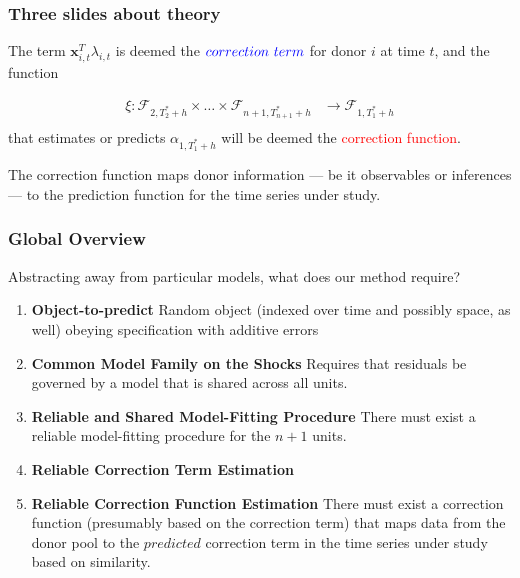 \documentclass[9pt]{beamer}
\newcommand{\x}{\textbf{x}}
\theoremstyle{definition}
\begin{document}
\begin{frame}\frametitle{Three slides about theory}
    The term $\x^{T}_{i,t}\lambda_{i,t}$ is deemed the $\textcolor{blue}{correction} \text{ } \textcolor{blue}{term}$ for donor $i$ at time $t$, and the function

    \begin{align*}
      \xi \colon \mathcal{F}_{2,T^{*}_{2}+h} \times \ldots \times \mathcal{F}_{n+1, T^{*}_{n+1}+h} &\to \mathcal{F}_{1,T^{*}_{1}+h}\\
    \end{align*}
    that estimates or predicts $\alpha_{1,T^{*}_{1}+h}$ will be deemed the \textcolor{red}{correction function}.  
    
    \bigskip 
    
    The correction function maps donor information --- be it observables or inferences --- to the prediction function for the time series under study. 
\end{frame}

\begin{frame}\frametitle{Global Overview}

    Abstracting away from particular models, what does our method require?

    \begin{enumerate}
        \item \textbf{Object-to-predict}
       Random object (indexed over time and possibly space, as well) obeying specification with additive errors 
            
      \item \textbf{Common Model Family on the Shocks} Requires that residuals be governed by a model that is shared across all units.  
      
      \item \textbf{Reliable and Shared Model-Fitting Procedure} There must exist a reliable model-fitting procedure for the $n+1$ units.
      
      \item \textbf{Reliable Correction Term Estimation} 

      \item \textbf{Reliable Correction Function Estimation} There must exist a correction function (presumably based on the correction term) that maps data from the donor pool to the $\textit{predicted}$ correction term in the time series under study based on similarity.  
    \end{enumerate}
\end{frame}
\end{document}
